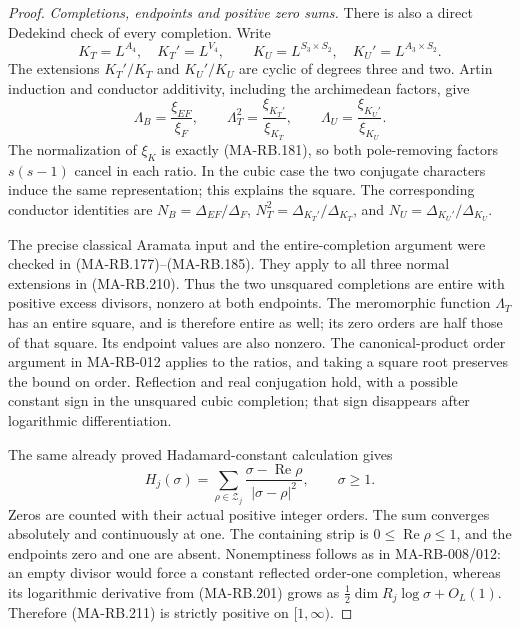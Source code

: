 \begin{proof}
\emph{Completions, endpoints and positive zero sums.}
There is also a direct Dedekind check of every completion.
Write
\[
 K_T=L^{A_4},\quad K_T'=L^{V_4},\qquad
 K_U=L^{S_3\times S_2},\quad K_U'=L^{A_3\times S_2}.
 \tag{MA-RB.209}
\]
The extensions \(K_T'/K_T\) and \(K_U'/K_U\) are cyclic
of degrees three and two. Artin induction and conductor
additivity, including the archimedean factors, give
\[
 \Lambda_B=\frac{\xi_{EF}}{\xi_F},\qquad
 \Lambda_T^2=\frac{\xi_{K_T'}}{\xi_{K_T}},\qquad
 \Lambda_U=\frac{\xi_{K_U'}}{\xi_{K_U}}.
 \tag{MA-RB.210}
\]
The normalization of \(\xi_K\) is exactly (MA-RB.181),
so both pole-removing factors \(s(s-1)\) cancel in each
ratio. In the cubic case the two conjugate characters
induce the same representation; this explains the square.
The corresponding conductor identities are
\(N_B=\Delta_{EF}/\Delta_F\),
\(N_T^2=\Delta_{K_T'}/\Delta_{K_T}\), and
\(N_U=\Delta_{K_U'}/\Delta_{K_U}\).

The precise classical Aramata input and the entire-completion
argument were checked in (MA-RB.177)--(MA-RB.185).
They apply to all three normal extensions in (MA-RB.210).
Thus the two unsquared completions are entire with positive
excess divisors, nonzero at both endpoints. The meromorphic
function \(\Lambda_T\) has an entire square, and is therefore
entire as well; its zero orders are half those of that square.
Its endpoint values are also nonzero. The canonical-product
order argument in MA-RB-012 applies to the ratios, and taking
a square root preserves the bound on order. Reflection and
real conjugation hold, with a possible constant sign in the
unsquared cubic completion; that sign disappears after
logarithmic differentiation.

The same already proved Hadamard-constant calculation gives
\[
 H_j(\sigma)=\sum_{\rho\in\mathcal Z_j}
          \frac{\sigma-\operatorname{Re}\rho}
               {|\sigma-\rho|^2},\qquad \sigma\ge1.
 \tag{MA-RB.211}
\]
Zeros are counted with their actual positive integer orders.
The sum converges absolutely and continuously at one.
The containing strip is \(0\le\operatorname{Re}\rho\le1\),
and the endpoints zero and one are absent. Nonemptiness
follows as in MA-RB-008/012: an empty divisor would force a
constant reflected order-one completion, whereas its logarithmic
derivative from (MA-RB.201) grows as
\(\tfrac12\dim R_j\log\sigma+O_L(1)\).
Therefore (MA-RB.211) is strictly positive on \([1,\infty)\).


\end{proof}
